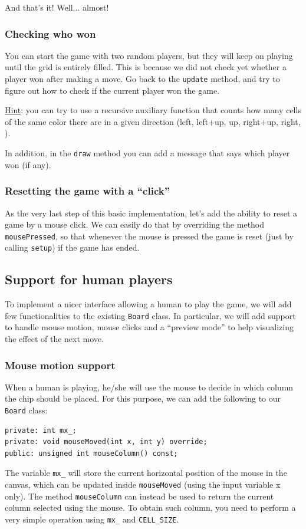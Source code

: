 \documentclass{article}
\begin{document}
And that's it! Well... almost!


\subsubsection{Checking who won}

You can start the game with two random players, but they will keep on playing until the grid is entirely filled. This is because we did not check yet whether a player won after making a move. Go back to the \texttt{update} method, and try to figure out how to check if the current player won the game.

\underline{Hint}: you can try to use a recursive auxiliary function that counts how many cells of the same color there are in a given direction (left, left+up, up, right+up, right, \etc).

In addition, in the \texttt{draw} method you can add a message that says which player won (if any).




\subsubsection{Resetting the game with a ``click''}\label{sec:reset_game}

As the very last step of this basic implementation, let's add the ability to reset a game by a mouse click. We can easily do that by overriding the method \texttt{mousePressed}, so that whenever the mouse is pressed the game is reset (just by calling \texttt{setup}) if the game has ended.




\subsection{Support for human players}

To implement a nicer interface allowing a human to play the game, we will add few functionalities to the existing \texttt{Board} class. In particular, we will add support to handle mouse motion, mouse clicks and a ``preview mode'' to help visualizing the effect of the next move.


\subsubsection{Mouse motion support}

When a human is playing, he/she will use the mouse to decide in which column the chip should be placed. For this purpose, we can add the following to our \texttt{Board} class:
\begin{lstlisting}[style=mycpp,numbers=none]
private: int mx_;
private: void mouseMoved(int x, int y) override;
public: unsigned int mouseColumn() const;
\end{lstlisting}
The variable \texttt{mx\string_} will store the current horizontal position of the mouse in the canvas, which can be updated inside \texttt{mouseMoved} (using the input variable x only). The method \texttt{mouseColumn} can instead be used to return the current column selected using the mouse. To obtain such column, you need to perform a very simple operation using \texttt{mx\string_} and \texttt{CELL\string_SIZE}.
\end{document}
